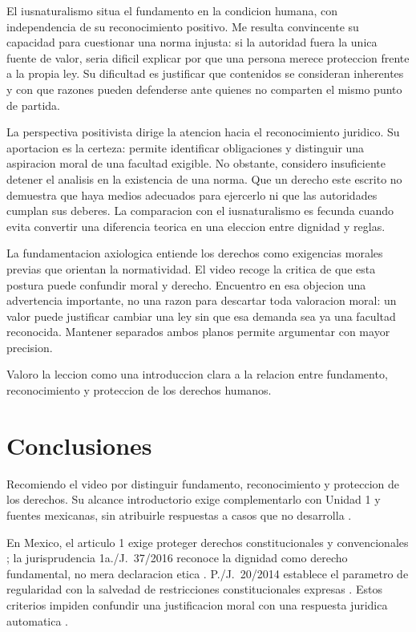 \documentclass[12pt,spanish,letterpaper,oneside]{article}
\begin{document}
\begin{resenabox}
El iusnaturalismo situa el fundamento en la condicion humana, con
independencia de su reconocimiento positivo. Me resulta convincente
su capacidad para cuestionar una norma injusta: si la autoridad fuera
la unica fuente de valor, seria dificil explicar por que una persona
merece proteccion frente a la propia ley. Su dificultad es justificar
que contenidos se consideran inherentes y con que razones pueden
defenderse ante quienes no comparten el mismo punto de partida.

La perspectiva positivista dirige la atencion hacia el reconocimiento
juridico. Su aportacion es la certeza: permite identificar obligaciones
y distinguir una aspiracion moral de una facultad exigible. No obstante,
considero insuficiente detener el analisis en la existencia de una
norma. Que un derecho este escrito no demuestra que haya medios
adecuados para ejercerlo ni que las autoridades cumplan sus deberes.
La comparacion con el iusnaturalismo es fecunda cuando evita convertir
una diferencia teorica en una eleccion entre dignidad y reglas.

La fundamentacion axiologica entiende los derechos como exigencias
morales previas que orientan la normatividad. El video recoge la critica
de que esta postura puede confundir moral y derecho. Encuentro en esa
objecion una advertencia importante, no una razon para descartar toda
valoracion moral: un valor puede justificar cambiar una ley sin que
esa demanda sea ya una facultad reconocida. Mantener separados ambos
planos permite argumentar con mayor precision.

Valoro la leccion como una introduccion clara a la relacion entre
fundamento, reconocimiento y proteccion de los derechos humanos.
\end{resenabox}

\clearpage
\section{Conclusiones}

Recomiendo el video por distinguir fundamento, reconocimiento y
proteccion de los derechos. Su alcance introductorio exige complementarlo
con Unidad 1 y fuentes mexicanas, sin atribuirle respuestas a casos
que no desarrolla \citep{unedVideo2024,cuadernilloADH2026}.

En Mexico, el articulo 1 exige proteger derechos constitucionales y
convencionales \citep[art.~1]{cpeumADH2026}; la jurisprudencia
1a./J.~37/2016 reconoce la dignidad como derecho fundamental, no mera
declaracion etica \citep{scjnDignidad2016ADH}. P./J.~20/2014 establece
el parametro de regularidad con la salvedad de restricciones
constitucionales expresas \citep{scjnParametro2014ADH}. Estos criterios
impiden confundir una justificacion moral con una respuesta juridica
automatica \citep{ibarraCurso2022ADH}.
\end{document}
